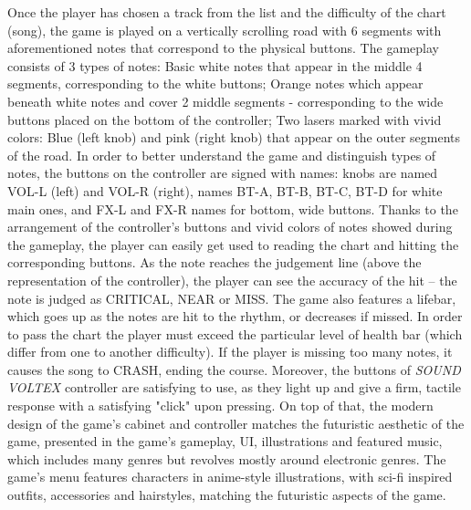 Once the player has chosen a track from the list and the difficulty of the chart (song), the game is played on a vertically scrolling road with 6 segments with aforementioned notes that correspond to the physical buttons. The gameplay consists of 3 types of notes: Basic white notes that appear in the middle 4 segments, corresponding to the white buttons; Orange notes which appear beneath white notes and cover 2 middle segments - corresponding to the wide buttons placed on the bottom of the controller; Two lasers marked with vivid colors: Blue (left knob) and pink (right knob) that appear on the outer segments of the road. In order to better understand the game and distinguish types of notes, the buttons on the controller are signed with names: knobs are named VOL-L (left) and VOL-R (right), names BT-A, BT-B, BT-C, BT-D for white main ones, and FX-L and FX-R names for bottom, wide buttons. Thanks to the arrangement of the controller's buttons and vivid colors of notes showed during the gameplay, the player can easily get used to reading the chart and hitting the corresponding buttons. As the note reaches the judgement line (above the representation of the controller), the player can see the accuracy of the hit -- the note is judged as CRITICAL, NEAR or MISS. The game also features a lifebar, which goes up as the notes are hit to the rhythm, or decreases if missed. In order to pass the chart the player must exceed the particular level of health bar (which differ from one to another difficulty). If the player is missing too many notes, it causes the song to CRASH, ending the course. Moreover, the buttons of \textit{SOUND VOLTEX} controller are satisfying to use, as they light up and give a firm, tactile response with a satisfying "click" upon pressing. On top of that, the modern design of the game's cabinet and controller matches the futuristic aesthetic of the game, presented in the game's gameplay, UI, illustrations and featured music, which includes many genres but revolves mostly around electronic genres. The game's menu features characters in anime-style illustrations, with sci-fi inspired outfits, accessories and hairstyles, matching the futuristic aspects of the game. 

